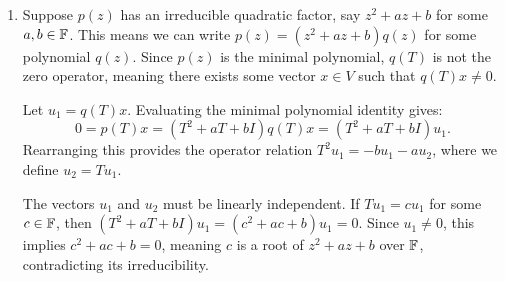 \begin{exc}
\begin{solution}
\begin{enumerate}[label=\arabic*)]
  If $\deg p(z)\ge2$, then $p(z)/(z-\lambda)$ has degree at least $1$ and must
  itself contain either a linear factor or an irreducible quadratic factor.
  The latter is handled by Case~2 below, so we consider the two linear cases:
  \begin{itemize}
  \item Repeated linear factor: $p(z)=(z-\lambda)^2q(z)$. Since $p(z)$ is the
    minimal polynomial, there exists $v\in V$ such that
    $(T-\lambda I)q(T)v\ne0$ but $(T-\lambda I)^2q(T)v=0$. Let $w=q(T)v$ and
    $u=(T-\lambda I)w$. Then $u\ne0$ and
    $(T-\lambda I)u=(T-\lambda I)^2w=0$, which implies $Tu=\lambda u$. Thus,
    $u$ is an eigenvector corresponding to the eigenvalue $\lambda$.
    Moreover, $Tw=(T-\lambda I)w+\lambda w=u+\lambda w$, which shows that
    $Tw\in\spn(u,w)$.

    To confirm linear independence, suppose $u=\alpha w$ for some
    $\alpha\in\F$. Then $(T-\lambda I)w=\alpha w$, so $w$ is an eigenvector of
    $T$ with eigenvalue $\lambda+\alpha$. But then
    $(T-\lambda I)^2w=\alpha^2w$. Since $(T-\lambda I)^2w=0$ and $w\ne0$, this
    forces $\alpha=0$, contradicting our deduction that $\alpha\ne0$ (since
    $u\ne0$). Therefore, $u$ and $w$ are linearly independent, and
    $\spn(u,w)$ is a $2$-dimensional invariant subspace of $V$ under $T$.
  \item Distinct linear factor: $p(z)=(z-\lambda)(z-\mu)g(z)$ with
    $\lambda\ne\mu$. Then $T$ has two distinct eigenvalues, yielding two
    linearly independent eigenvectors $v$ and $u$. The subspace $\spn(v,u)$
    is $2$-dimensional, and since $Tv=\lambda v\in\spn(v,u)$ and
    $Tu=\mu u\in\spn(v,u)$, it is explicitly invariant.
  \end{itemize}
\item Suppose $p(z)$ has an irreducible quadratic factor, say $z^2+az+b$ for
  some $a,b\in\mathbb{F}$. This means we can write $p(z)=(z^2+az+b)q(z)$ for some
  polynomial $q(z)$. Since $p(z)$ is the minimal polynomial, $q(T)$ is not the
  zero operator, meaning there exists some vector $x\in V$ such that
  $q(T)x\ne0$.

  Let $u_1=q(T)x$. Evaluating the minimal polynomial identity gives:
  \[ 0=p(T)x=(T^2+aT+bI)q(T)x=(T^2+aT+bI)u_1. \]
  Rearranging this provides the operator relation $T^2u_1=-bu_1-au_2$, where
  we define $u_2=Tu_1$.

  The vectors $u_1$ and $u_2$ must be linearly independent. If $Tu_1=cu_1$ for
  some $c\in\mathbb{F}$, then $(T^2+aT+bI)u_1=(c^2+ac+b)u_1=0$. Since $u_1\ne0$, this
  implies $c^2+ac+b=0$, meaning $c$ is a root of $z^2+az+b$ over $\mathbb{F}$,
  contradicting its irreducibility.


\end{enumerate}
\end{solution}
\end{exc}
